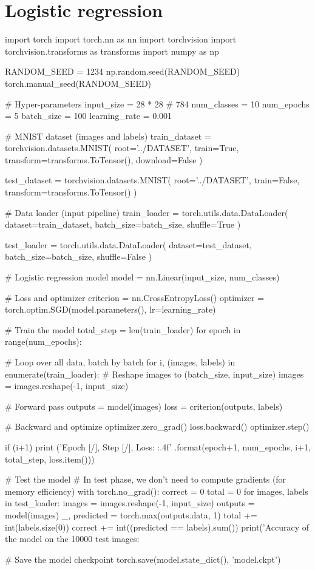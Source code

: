 \documentclass[a4paper,11pt]{article} %
\begin{document}
\section{Logistic regression}


\begin{pythoncode}
import torch
import torch.nn as nn
import torchvision
import torchvision.transforms as transforms
import numpy as np

RANDOM_SEED = 1234
np.random.seed(RANDOM_SEED)
torch.manual_seed(RANDOM_SEED)

# Hyper-parameters 
input_size = 28 * 28    # 784
num_classes = 10
num_epochs = 5
batch_size = 100
learning_rate = 0.001

# MNIST dataset (images and labels)
train_dataset = torchvision.datasets.MNIST(
    root='../DATASET', 
    train=True, 
    transform=transforms.ToTensor(),
    download=False
)
    
test_dataset = torchvision.datasets.MNIST(
    root='../DATASET', 
    train=False, 
    transform=transforms.ToTensor()
)

# Data loader (input pipeline)
train_loader = torch.utils.data.DataLoader(
    dataset=train_dataset, 
    batch_size=batch_size, 
    shuffle=True
)

test_loader = torch.utils.data.DataLoader(
    dataset=test_dataset, 
    batch_size=batch_size, 
    shuffle=False
)
    
# Logistic regression model
model = nn.Linear(input_size, num_classes)
    
# Loss and optimizer
criterion = nn.CrossEntropyLoss()  
optimizer = torch.optim.SGD(model.parameters(), lr=learning_rate)  

# Train the model
total_step = len(train_loader)
for epoch in range(num_epochs):

    # Loop over all data, batch by batch
    for i, (images, labels) in enumerate(train_loader):
        # Reshape images to (batch_size, input_size)
        images = images.reshape(-1, input_size)

        # Forward pass
        outputs = model(images)
        loss = criterion(outputs, labels)
            
        # Backward and optimize
        optimizer.zero_grad()
        loss.backward()
        optimizer.step()
            
        if (i+1) %
            print ('Epoch [{}/{}], Step [{}/{}], Loss: {:.4f}' 
                   .format(epoch+1, num_epochs, i+1, total_step, loss.item()))
    
# Test the model
# In test phase, we don't need to compute gradients (for memory efficiency)
with torch.no_grad():
    correct = 0
    total = 0
    for images, labels in test_loader:
        images = images.reshape(-1, input_size)
        outputs = model(images)
        _, predicted = torch.max(outputs.data, 1)
        total += int(labels.size(0))
        correct += int((predicted == labels).sum())
    print('Accuracy of the model on the 10000 test images: {} %
    
# Save the model checkpoint
torch.save(model.state_dict(), 'model.ckpt')    
\end{pythoncode}




\end{document}
